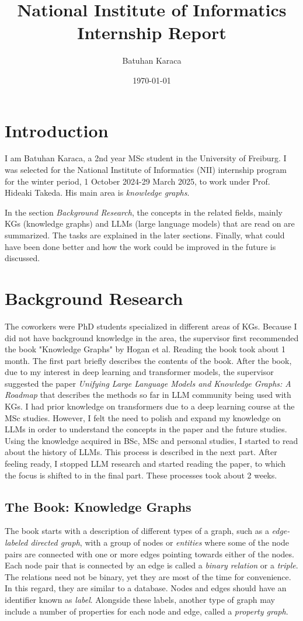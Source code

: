 \documentclass{article}
\title{National Institute of Informatics Internship Report}
\author{Batuhan Karaca}
\date{\today}
\begin{document}
\maketitle
\tableofcontents

\section{Introduction}
I am Batuhan Karaca, a 2nd year MSc student in the University of Freiburg. I was selected for the National Institute of Informatics (NII) internship program for the winter period, 1 October 2024-29 March 2025, to work under Prof. Hideaki Takeda. His main area is \textit{knowledge graphs}. 

In the section \textit{Background Research}, the concepts in the related fields, mainly KGs (knowledge graphs) and LLMs (large language models) that are read on are summarized. The tasks are explained in the later sections. Finally, what could have been done better and how the work could be improved in the future is discussed. 
\section{Background Research}
The coworkers were PhD students specialized in different areas of KGs. Because I did not have background knowledge in the area, the supervisor first recommended the book "Knowledge Graphs" by Hogan et al. Reading the book took about 1 month. The first part briefly describes the contents of the book. After the book, due to my interest in deep learning and transformer models, the supervisor suggested the paper \textit{Unifying Large Language Models and Knowledge Graphs: A Roadmap} that describes the methods so far in LLM community being used with KGs. I had prior knowledge on transformers due to a deep learning course at the MSc studies. However, I felt the need to polish and expand my knowledge on LLMs in order to understand the concepts in the paper and the future studies. Using the knowledge acquired in BSc, MSc and personal studies, I started to read about the history of LLMs. This process is described in the next part. After feeling ready, I stopped LLM research and started reading the paper, to which the focus is shifted to in the final part. These processes took about 2 weeks.
\subsection{The Book: Knowledge Graphs}
The book starts with a description of different types of a graph, such as a \textit{edge-labeled directed graph}, with a group of nodes or \textit{entities} where some of the node pairs are connected with one or more edges pointing towards either of the nodes. Each node pair that is connected by an edge is called a \textit{binary relation} or a \textit{triple}. The relations need not be binary, yet they are most of the time for convenience. In this regard, they are similar to a database. Nodes and edges should have an identifier known as \textit{label}. Alongside these labels, another type of graph may include a number of properties for each node and edge, called a \textit{property graph}. 
\end{document}
